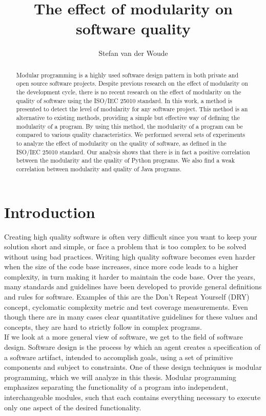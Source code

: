 \documentclass[twoside]{uva-inf-bachelor-thesis}
\title{The effect of modularity on software quality}
\author{Stefan van der Woude}
\begin{document}
\maketitle

\begin{abstract}
Modular programming is a highly used software design pattern in both private and open source software projects. Despite previous research on the effect of modularity on the development cycle, there is no recent research on the effect of modularity on the quality of software using the ISO/IEC 25010 standard. In this work, a method is presented to detect the level of modularity for any software project. This method is an alternative to existing methods, providing a simple but effective way of defining the modularity of a program. By using this method, the modularity of a program can be compared to various quality characteristics. We performed several sets of experiments to analyze the effect of modularity on the quality of software, as defined in the ISO/IEC 25010 standard. Our analysis shows that there is in fact a positive correlation between the modularity and the quality of Python programs. We also find a weak correlation between modularity and quality of Java programs.
\end{abstract}

\tableofcontents


\chapter{Introduction}
Creating high quality software is often very difficult since you want to keep your solution short and simple, or face a problem that is too complex to be solved without using bad practices. Writing high quality software becomes even harder when the size of the code base increases, since more code leads to a higher complexity\cite{bhatia2014survey}, in turn making it harder to maintain the code base\cite{banker1993software}. Over the years, many standards and guidelines have been developed to provide general definitions and rules for software. Examples of this are the Don't Repeat Yourself (DRY) concept\cite{hunt2000pragmatic}, cyclomatic complexity metric\cite{mccabe1976complexity} and test coverage measurements\cite{miller1963systematic}. Even though there are in many cases clear quantitative guidelines for these values and concepts, they are hard to strictly follow in complex programs.\\

If we look at a more general view of software, we get to the field of software design. Software design is the process by which an agent creates a specification of a software artifact, intended to accomplish goals, using a set of primitive components and subject to constraints\cite{ralph2009proposal}. One of these design techniques is modular programming\cite{barnett1968modular}, which we will analyze in this thesis. Modular programming emphasizes separating the functionality of a program into independent, interchangeable modules, such that each contains everything necessary to execute only one aspect of the desired functionality.
\end{document}
